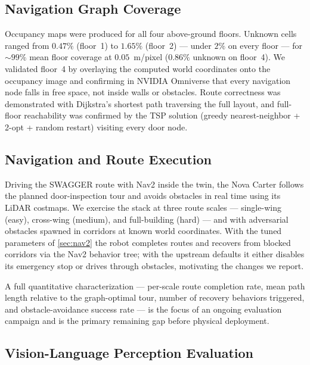 \documentclass[10pt,twocolumn,letterpaper]{article}
\begin{document}
\subsection{Navigation Graph Coverage}

Occupancy maps were produced for all four above-ground floors. Unknown cells
ranged from $0.47\%$ (floor~1) to $1.65\%$ (floor~2) --- under $2\%$ on every
floor --- for ${\sim}99\%$ mean floor coverage at $0.05$~m/pixel ($0.86\%$
unknown on floor~4). We validated floor~4 by overlaying the computed
world coordinates onto the occupancy image and confirming in NVIDIA Omniverse that
every navigation node falls in free space, not inside walls or obstacles. Route
correctness was demonstrated with Dijkstra's shortest path traversing the full
layout, and full-floor reachability was confirmed by the TSP solution (greedy
nearest-neighbor + 2-opt + random restart) visiting every door node.

\subsection{Navigation and Route Execution}

Driving the SWAGGER route with Nav2 inside the twin, the Nova Carter follows the
planned door-inspection tour and avoids obstacles in real time using its LiDAR
costmaps. We exercise the stack at three route scales --- single-wing (easy),
cross-wing (medium), and full-building (hard) --- and with adversarial obstacles
spawned in corridors at known world coordinates. With the tuned parameters of
\cref{sec:nav2} the robot completes routes and recovers from blocked corridors via
the Nav2 behavior tree; with the upstream defaults it either disables its
emergency stop or drives through obstacles, motivating the changes we report.

A full quantitative characterization --- per-scale route completion rate, mean
path length relative to the graph-optimal tour, number of recovery behaviors
triggered, and obstacle-avoidance success rate --- is the focus of an ongoing
evaluation campaign and is the primary remaining gap before physical deployment.

\subsection{Vision-Language Perception Evaluation}
\label{sec:vlm-eval}
\end{document}

